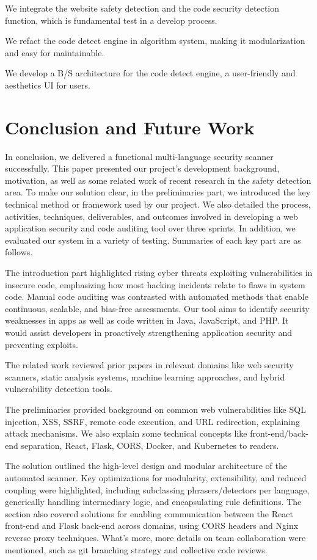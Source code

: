 \documentclass[journal]{IEEEtran}
\begin{document}
We integrate the website safety detection and the code security detection function, which is fundamental test in a develop process.

We refact the code detect engine in algorithm system, making it modularization and easy for maintainable.

We develop a B/S architecture for the code detect engine, a user-friendly and aesthetics UI for users.

\section{Conclusion and Future Work}
\label{sec:conclusion}
\noindent In conclusion, we delivered a functional multi-language security scanner successfully. This paper presented our project's development background, motivation, as well as some related work of recent research in the safety detection area. To make our solution clear, in the preliminaries part, we introduced the key technical method or framework used by our project. We also detailed the process, activities, techniques, deliverables, and outcomes involved in developing a web application security and code auditing tool over three sprints. In addition, we evaluated our system in a variety of testing. Summaries of each key part are as follows.

The introduction part highlighted rising cyber threats exploiting vulnerabilities in insecure code, emphasizing how most hacking incidents relate to flaws in system code. Manual code auditing was contrasted with automated methods that enable continuous, scalable, and bias-free assessments. Our tool aims to identify security weaknesses in apps as well as code written in Java, JavaScript, and PHP. It would assist developers in proactively strengthening application security and preventing exploits.

The related work reviewed prior papers in relevant domains like web security scanners, static analysis systems, machine learning approaches, and hybrid vulnerability detection tools.

The preliminaries provided background on common web vulnerabilities like SQL injection, XSS, SSRF, remote code execution, and URL redirection, explaining attack mechanisms. We also explain some technical concepts like front-end/back-end separation, React, Flask, CORS, Docker, and Kubernetes to readers.

The solution outlined the high-level design and modular architecture of the automated scanner. Key optimizations for modularity, extensibility, and reduced coupling were highlighted, including subclassing phrasers/detectors per language, generically handling intermediary logic, and encapsulating rule definitions. The section also covered solutions for enabling communication between the React front-end and Flask back-end across domains, using CORS headers and Nginx reverse proxy techniques. What's more, more details on team collaboration were mentioned, such as git branching strategy and collective code reviews.
\end{document}
